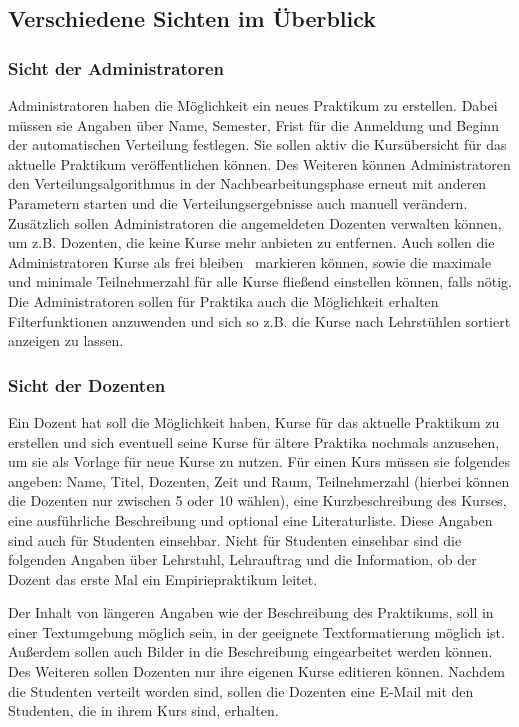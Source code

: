         \subsection{Verschiedene Sichten im Überblick}
        \label{Sichten}
            \subsubsection{Sicht der Administratoren}
                Administratoren haben die Möglichkeit ein neues Praktikum zu erstellen.
                Dabei müssen sie Angaben über Name, Semester, Frist für die Anmeldung und Beginn der automatischen Verteilung festlegen.
                Sie sollen aktiv die Kursübersicht für das aktuelle Praktikum veröffentlichen können.
                Des Weiteren können Administratoren den Verteilungsalgorithmus in der Nachbearbeitungsphase erneut mit anderen Parametern starten und die Verteilungsergebnisse auch manuell verändern.
                Zusätzlich sollen Administratoren die angemeldeten Dozenten verwalten können, um z.B. Dozenten, die keine Kurse mehr anbieten zu entfernen.
                Auch sollen die Administratoren Kurse als \glqq frei bleiben\grqq~ markieren können, sowie die maximale und minimale Teilnehmerzahl für alle Kurse fließend einstellen können, falls nötig.
                Die Administratoren sollen für Praktika auch die Möglichkeit erhalten Filterfunktionen anzuwenden und sich so z.B. die Kurse nach Lehrstühlen sortiert anzeigen zu lassen.
            
            \subsubsection{Sicht der Dozenten}
                Ein Dozent hat soll die Möglichkeit haben, Kurse für das aktuelle Praktikum zu erstellen und sich eventuell seine Kurse für ältere Praktika nochmals anzusehen, um sie als Vorlage für neue Kurse zu nutzen. 
                Für einen Kurs müssen sie folgendes angeben: Name, Titel, Dozenten, Zeit und Raum, Teilnehmerzahl (hierbei können die Dozenten nur zwischen 5 oder 10 wählen), eine Kurzbeschreibung des Kurses, eine ausführliche Beschreibung und optional eine Literaturliste.
                Diese Angaben sind auch für Studenten einsehbar.
                Nicht für Studenten einsehbar sind die folgenden Angaben über Lehrstuhl, Lehrauftrag und die Information, ob der Dozent das erste Mal ein Empiriepraktikum leitet.
                
                Der Inhalt von längeren Angaben wie der Beschreibung des Praktikums, soll in einer Textumgebung möglich sein, in der geeignete Textformatierung möglich ist.
                Außerdem sollen auch Bilder in die Beschreibung eingearbeitet werden können.
                Des Weiteren sollen Dozenten nur ihre eigenen Kurse editieren können.
                Nachdem die Studenten verteilt worden sind, sollen die Dozenten eine E-Mail mit den Studenten, die in ihrem Kurs sind, erhalten.
                
